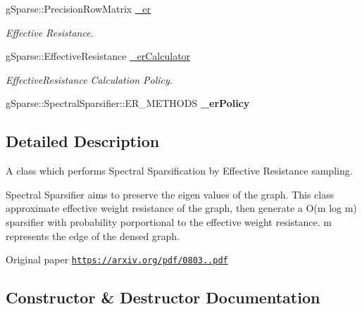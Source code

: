 \begin{DoxyCompactItemize}
\mbox{\label{classg_sparse_1_1_spectral_sparsifier_1_1_e_r_sampling_a54a2bc9c9dfda467a946c64afcfc46fc}} 
g\+Sparse\+::\+Precision\+Row\+Matrix \mbox{\hyperlink{classg_sparse_1_1_spectral_sparsifier_1_1_e_r_sampling_a54a2bc9c9dfda467a946c64afcfc46fc}{\+\_\+er}}
\begin{DoxyCompactList}\small\item\em Effective Resistance. \end{DoxyCompactList}\item 
\mbox{\label{classg_sparse_1_1_spectral_sparsifier_1_1_e_r_sampling_aa6ab4a22339f9846fabc82437dced6f2}} 
g\+Sparse\+::\+Effective\+Resistance \mbox{\hyperlink{classg_sparse_1_1_spectral_sparsifier_1_1_e_r_sampling_aa6ab4a22339f9846fabc82437dced6f2}{\+\_\+er\+Calculator}}
\begin{DoxyCompactList}\small\item\em Effective\+Resistance Calculation Policy. \end{DoxyCompactList}\item 
\mbox{\label{classg_sparse_1_1_spectral_sparsifier_1_1_e_r_sampling_a26b6aebe0adb1851149c74017fdb73e0}} 
g\+Sparse\+::\+Spectral\+Sparsifier\+::\+E\+R\+\_\+\+M\+E\+T\+H\+O\+DS {\bfseries \+\_\+er\+Policy}
\end{DoxyCompactItemize}


\subsection{Detailed Description}
A class which performs Spectral Sparsification by Effective Resistance sampling. 

Spectral Sparsifier aims to preserve the eigen values of the graph. This class approximate effective weight resistance of the graph, then generate a O(m log m) sparsifier with probability porportional to the effective weight resistance. m represents the edge of the densed graph.

Original paper \href{https://arxiv.org/pdf/0803.0929.pdf}{\tt https\+://arxiv.\+org/pdf/0803..\+pdf} 

\subsection{Constructor \& Destructor Documentation}
\mbox{\label{classg_sparse_1_1_spectral_sparsifier_1_1_e_r_sampling_a1ceb48c424600cbe6d315f3f5bad1598}} 
